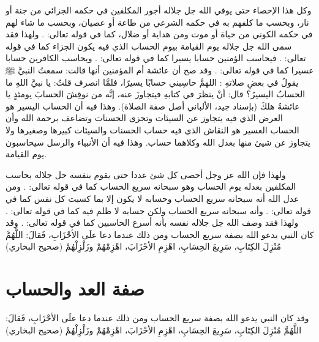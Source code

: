 وكل هذا الإحصاء حتى يوفي الله جل جلاله أجور المكلفين في حكمه الجزائي من جنة أو نار، وبحسب ما كلفهم به في حكمه الشرعي من طاعة أو عصيان، وبحسب ما شاء لهم في حكمه الكوني من حياة أو موت ومن هداية أو ضلال، كما في قوله تعالى: \quranayah*[3][185]{\footnotesize \surahname*[3]}. ولهذا فقد سمى الله جل جلاله يوم القيامة بيوم الحساب الذي فيه يكون الجزاء كما في قوله تعالى: \quranayah*[38][53]{\footnotesize \surahname*[38]}. فيحاسب الؤمنين حسابا يسيرا كما في قوله تعالى: \quranayah*[84][7-9]{\footnotesize \surahname*[84]}. ويحاسب الكافرين حسابا عسيرا كما في قوله تعالى: \quranayah*[84][10-15]{\footnotesize \surahname*[84]}. وقد صح أن عائشة أم المؤمنين أنها قالت: سمعتُ النبيَّ ﷺ يقولُ في بعضِ صلاتهِ : اللهمَّ حاسِبني حسابًا يسيرًا، فلمَّا انصرف قلتُ: يا نبيَّ اللهِ ما الحسابُ اليسيرُ؟ قال: أنْ ينظرَ في كتابهِ فيتجاوزَ عنه، إنَّه من نوقِشَ الحسابَ يومئذٍ يا عائشةُ هلكَ {\footnotesize (بإسناد جيد، الألباني أصل صفة الصلاة)}. وهذا فيه أن الحساب اليسير هو العرض الذي فيه يتجاوز عن السيئات وتجزى الحسنات وتضاعف برحمة الله وأن الحساب العسير هو النقاش الذي فيه حساب الحسنات والسيئات كبيرها وصغيرها ولا يتجاوز عن شيئ منها بعدل الله وكلاهما حساب. وهذا فيه أن الأنبياء والرسل سيحاسبون يوم القيامة. 

ولهذا فإن الله عز وجل أحصى كل شئ عددا حتى يقوم بنفسه جل جلاله بحاسب المكلفين بعدله يوم الحساب وهو سبحانه سريع الحساب كما في قوله تعالى: \quranayah*[13][40-41]{\footnotesize \surahname*[13]}. ومن عدل الله أنه سبحانه سريع الحساب وحسابه لا يكون إلا بما كسبت كل نفس كما في قوله تعالى: \quranayah*[14][51]{\footnotesize \surahname*[14]}. وأنه سبحانه سريع الحساب ولكن حسابه لا ظلم فيه كما في قوله تعالى: \quranayah*[40][17]{\footnotesize \surahname*[40]}. ولهذا فقد وصف الله جل جلاله نفسه بأنه أسرع الحاسبين كما في قوله تعالى: \quranayah*[6][62]{\footnotesize \surahname*[6]}. وقد كان النبي يدعو الله بصفة سريع الحساب ومن ذلك عندما دعا علَى الأحْزَابِ، فَقالَ: اللَّهُمَّ مُنْزِلَ الكِتَابِ، سَرِيعَ الحِسَابِ، اهْزِمِ الأحْزَابَ، اهْزِمْهُمْ وزَلْزِلْهُمْ {\footnotesize (صحيح البخاري)}




\section{صفة العد والحساب}

 

\quranayah*[9][111]{\footnotesize \surahname*[9]}


وقد كان النبي يدعو الله بصفة سريع الحساب ومن ذلك عندما دعا علَى الأحْزَابِ، فَقالَ: اللَّهُمَّ مُنْزِلَ الكِتَابِ، سَرِيعَ الحِسَابِ، اهْزِمِ الأحْزَابَ، اهْزِمْهُمْ وزَلْزِلْهُمْ {\footnotesize (صحيح البخاري)}

